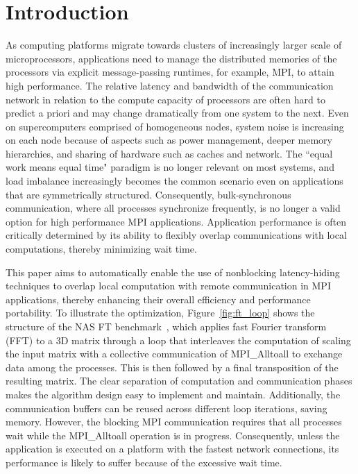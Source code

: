 \section{Introduction}
\label{sec:intro}

As computing platforms migrate towards clusters of increasingly larger scale of microprocessors,
 applications need to manage the distributed memories of the processors via explicit
message-passing runtimes, for example, MPI, to attain high performance.
The relative latency and bandwidth of the communication network in relation to the compute capacity of processors
are often hard to predict a priori and may change dramatically from one system to the next.
Even on supercomputers comprised of homogeneous nodes,
system noise is increasing on each node because of aspects such as power management, deeper memory hierarchies, and sharing of hardware such as caches and network. The ``equal work means equal time" paradigm is no longer relevant on most systems, and load imbalance increasingly becomes the common scenario even on applications that are symmetrically structured.
Consequently, bulk-synchronous communication, where all processes synchronize frequently, is no longer a valid option for high performance MPI applications.
Application performance is often critically determined by its ability to flexibly overlap communications with local computations,
thereby minimizing wait time.


This paper aims to automatically enable the use of nonblocking latency-hiding techniques to overlap local computation with remote communication in MPI applications, thereby enhancing their overall efficiency and performance portability.
To illustrate the optimization, Figure~\ref{fig:ft_loop} shows the
structure of the NAS FT benchmark~\cite{npb}, which applies fast
Fourier transform (FFT) to a 3D matrix through a loop that interleaves
the computation of scaling the input matrix with a collective
communication of MPI\_Alltoall to exchange data among the
processes. This is then followed by a final transposition of the
resulting matrix.  The clear separation of computation and
communication phases makes the algorithm design easy to implement and
maintain.  Additionally, the communication buffers can be reused
across different loop iterations, saving memory.  However, the
blocking MPI communication requires that all processes wait while the
MPI\_Alltoall operation is in progress.  Consequently, unless the
application is executed on a platform with the fastest network
connections, its performance is likely to suffer because of the
excessive wait time.

